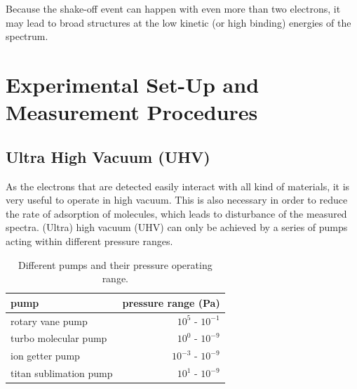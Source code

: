 \documentclass[a4paper]{scrartcl}
\numberwithin{equation}{section}
\numberwithin{figure}{section}
\numberwithin{table}{section}
\begin{document}
Because the shake-off event can happen with even more than two electrons, it may lead to broad structures at the low kinetic (or high binding) energies of the spectrum.



\section{Experimental Set-Up and Measurement Procedures}
\FloatBarrier
\subsection{Ultra High Vacuum (UHV)}
As the electrons that are detected easily interact with all kind of materials, it is very useful to operate in high vacuum. This is also necessary in order to reduce the rate of adsorption of molecules, which leads to disturbance of the measured spectra. (Ultra) high  vacuum (UHV) can only be achieved by a series of pumps acting within different pressure ranges.
\begin{table}
\begin{tabular}{lr}
\toprule
pump & pressure range (Pa)\\
\midrule
\small rotary vane pump & $10^5$ - $10^{-1}$  \\ 
\small turbo molecular pump &  $10^0$  - $10^{-9}$  \\
\small ion getter pump  & $ 10^{-3}$  - $10^{-9}$  \\
\small titan sublimation pump & $10^1$  - $10^{-9}$  \\
\bottomrule
\end{tabular}
\caption{Different pumps and their pressure operating range. \cite{gop} }
\label{tab:pump}
\end{table}
\end{document}
